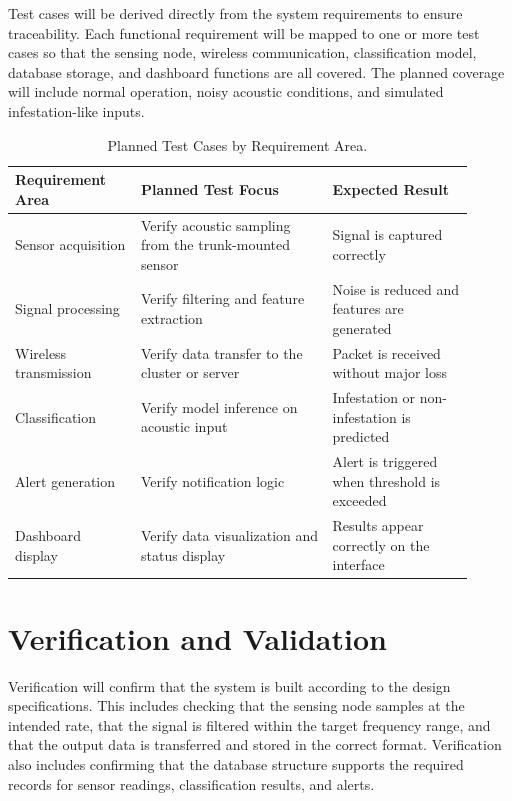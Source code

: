 \documentclass[12pt,a4paper,oneside]{memoir}
\begin{document}
Test cases will be derived directly from the system requirements to ensure traceability. Each functional requirement will be mapped to one or more test cases so that the sensing node, wireless communication, classification model, database storage, and dashboard functions are all covered. The planned coverage will include normal operation, noisy acoustic conditions, and simulated infestation-like inputs.

\begin{table}[h]
\centering
\caption{Planned Test Cases by Requirement Area.}
\label{tab:testcases}
\renewcommand{\arraystretch}{1.3}
\begin{tabular}{@{} p{0.25\linewidth} p{0.38\linewidth} p{0.28\linewidth} @{}}
\toprule
\textbf{Requirement Area} & \textbf{Planned Test Focus} & \textbf{Expected Result} \\
\midrule
Sensor acquisition    & Verify acoustic sampling from the trunk-mounted sensor & Signal is captured correctly \\
Signal processing     & Verify filtering and feature extraction                & Noise is reduced and features are generated \\
Wireless transmission & Verify data transfer to the cluster or server          & Packet is received without major loss \\
Classification        & Verify model inference on acoustic input               & Infestation or non-infestation is predicted \\
Alert generation      & Verify notification logic                              & Alert is triggered when threshold is exceeded \\
Dashboard display     & Verify data visualization and status display           & Results appear correctly on the interface \\
\bottomrule
\end{tabular}
\end{table}

\section{Verification and Validation}
\label{sec:VandV}

Verification will confirm that the system is built according to the design specifications. This includes checking that the sensing node samples at the intended rate, that the signal is filtered within the target frequency range, and that the output data is transferred and stored in the correct format. Verification also includes confirming that the database structure supports the required records for sensor readings, classification results, and alerts.
\end{document}
